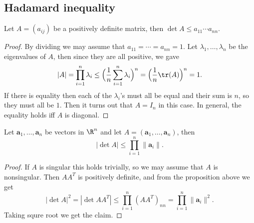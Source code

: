 \subsection{Hadamard inequality}
\begin{proposition}
Let $A=(a_{ij})$ be a positively definite matrix, then $\det A\leq a_{11}\cdots a_{nn}$.
\end{proposition}
\begin{proof}
By dividing we may assume that $a_{11}=\cdots=a_{nn}=1$. Let $\lambda_1,\dots,\lambda_n$ be the eigenvalues of $A$, then since they are all positive, we gave
\[|A|=\prod_{i=1}^{n}\lambda_i\leq\Big(\frac{1}{n}\sum_{i=1}^{n}\lambda_i\Big)^n=\Big(\frac{1}{n}\tr(A)\Big)^n=1.\]
If there is equality then each of the $\lambda_i$'s must all be equal and their sum is $n$, so they must all be $1$. Then it turns out that $A=I_n$ in this case. In general, the equality holds iff $A$ is diagonal.
\end{proof}
\begin{corollary}
Let $\bm{a}_1,\dots,\bm{a}_n$ be vectors in $\R^n$ and let $A=(\bm{a}_1,\dots,\bm{a}_n)$, then
\[|\det A|\leq\prod_{i=1}^{n}\|\bm{a}_i\|.\]
\end{corollary}
\begin{proof}
If $A$ is singular this holds trivially, so we may assume that $A$ is nonsingular. Then $AA^T$ is positively definite, and from the proposition above we get
\[|\det A|^2=|\det AA^T|\leq\prod_{i=1}^{n}(AA^T)_{nn}=\prod_{i=1}^{n}\|\bm{a}_i\|^2.\]
Taking squre root we get the claim.
\end{proof}
